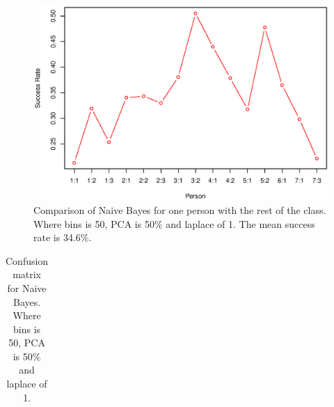 \begin{figure}[H]
\centering
\includegraphics[width = \textwidth]{graphics/graph_baye_comparison}
\caption{Comparison of Naive Bayes for one person with the rest of the class.
Where bins is 50, PCA is 50\% and laplace of 1. The mean success rate is 34.6\%.}
\label{fig:comp_naiveBayes}
\end{figure}


\begin{table}[H]
\centering
	\begin{subtable}{0.4\textwidth}
        \flushright
    \end{subtable}
    
    \begin{subtable}{0.1\textwidth}
        \flushright
    \end{subtable}
    \begin{subtable}{0.65\textwidth}
            \centering
            {\scriptsize
                \begin{tabular}{l|*{10}{c}}
                    
                \end{tabular}
            }
    \end{subtable}
    \caption{Confusion matrix for Naive Bayes.
    Where bins is 50, PCA is 50\% and laplace of 1.}
    \label{tb:confus}
\end{table}



